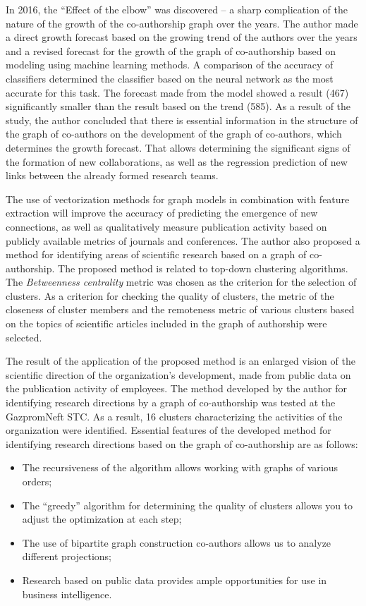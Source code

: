 \documentclass[12pt]{report}
\theoremstyle{definition}
\providecommand{\tightlist}{%
	\setlength{\itemsep}{0pt}\setlength{\parskip}{0pt}}
\begin{document}
In 2016, the ``Effect of the elbow'' was discovered -- a sharp complication of the nature of the growth of the co-authorship graph over the years.
The author made a direct growth forecast based on the growing trend of the authors over the years and a revised forecast for the growth of the graph of co-authorship based on modeling using machine learning methods.
A comparison of the accuracy of classifiers determined the classifier based on the neural network as the most accurate for this task.
The forecast made from the model showed a result (467) significantly smaller than the result based on the trend (585).
As a result of the study, the author concluded that there is essential information in the structure of the graph of co-authors on the development of the graph of co-authors, which determines the growth forecast. 
That allows determining the significant signs of the formation of new collaborations, as well as the regression prediction of new links between the already formed research teams.

The use of vectorization methods for graph models in combination with feature extraction will improve the accuracy of predicting the emergence of new connections, as well as qualitatively measure publication activity based on publicly available metrics of journals and conferences.
The author also proposed a method for identifying areas of scientific research based on a graph of co-authorship. 
The proposed method is related to top-down clustering algorithms. 
The \textit{Betweenness centrality} metric was chosen as the criterion for the selection of clusters.
As a criterion for checking the quality of clusters, the metric of the closeness of cluster members and the remoteness metric of various clusters based on the topics of scientific articles included in the graph of authorship were selected.

The result of the application of the proposed method is an enlarged vision of the scientific direction of the organization’s development, made from public data on the publication activity of employees.
The method developed by the author for identifying research directions by a graph of co-authorship was tested at the GazpromNeft STC. 
As a result, 16 clusters characterizing the activities of the organization were identified.
Essential features of the developed method for identifying research directions based on the graph of co-authorship are as follows:

\begin{itemize}
	\tightlist
	\item The recursiveness of the algorithm allows working with graphs of various orders;
	\item The ``greedy'' algorithm for determining the quality of clusters allows you to adjust the optimization at each step;
	\item The use of bipartite graph construction co-authors allows us to analyze different projections;
	\item Research based on public data provides ample opportunities for use in business intelligence.
\end{itemize}
\end{document}
